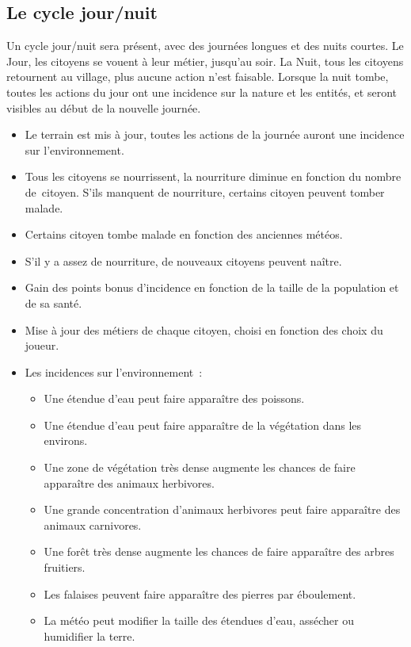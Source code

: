 \documentclass[a4paper]{article}
\begin{document}
\subsection*{Le cycle jour/nuit}
Un cycle jour/nuit sera présent, avec des journées longues et des nuits courtes. Le Jour, les citoyens se vouent à leur métier, jusqu'au soir. La Nuit, tous les citoyens retournent au village, plus aucune action n'est faisable. Lorsque la nuit tombe, toutes les actions du jour ont une incidence sur la nature et les entités, et seront visibles au début de la nouvelle journée.
\begin{itemize}
\item \small Le terrain est mis à jour, toutes les actions de la journée auront une incidence sur l'environnement. \normalsize
\item \small Tous les citoyens se nourrissent, la nourriture diminue en fonction du nombre de citoyen. S'ils manquent de nourriture, certains citoyen peuvent tomber malade. \normalsize
\item \small Certains citoyen tombe malade en fonction des anciennes météos. \normalsize
\item \small S'il y a assez de nourriture, de nouveaux citoyens peuvent naître. \normalsize
\item \small Gain des points bonus d'incidence en fonction de la taille de la population et de sa santé. \normalsize
\item \small Mise à jour des métiers de chaque citoyen, choisi en fonction des choix du joueur. \normalsize
\bigskip
\item \small Les incidences sur l'environnement :
  \begin{itemize}
    \item \small Une étendue d'eau peut faire apparaître des poissons. \normalsize
    \item \small Une étendue d'eau peut faire apparaître de la végétation dans les environs. \normalsize
    \item \small Une zone de végétation très dense augmente les chances de faire apparaître des animaux herbivores. \normalsize
    \item \small Une grande concentration d'animaux herbivores peut faire apparaître des animaux carnivores. \normalsize
    \item \small Une forêt très dense augmente les chances de faire apparaître des arbres fruitiers. \normalsize
    \item \small Les falaises peuvent faire apparaître des pierres par éboulement. \normalsize
    \item \small La météo peut modifier la taille des étendues d'eau, assécher ou humidifier la terre. \normalsize
  \end{itemize}
\end{itemize}
\end{document}
